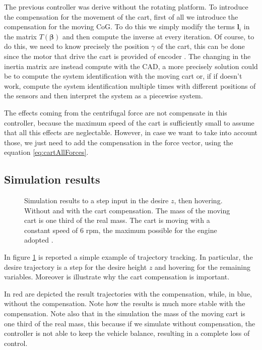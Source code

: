 \noindent The previous controller was derive without the rotating platform. To introduce the compensation for the movement of the cart, first of all we introduce the compensation for the moving CoG. To do this we simply modify the terms $\mathbf{l}_i$ in the matrix $T(\boldsymbol{\beta})$ and then compute the inverse at every iteration. Of course, to do this, we need to know precisely the position $\gamma$ of the cart, this can be done since the motor that drive the cart is provided of encoder \cite{Carlos}. The changing in the inertia matrix are instead compute with the CAD, a more precisely solution could be to compute the system identification with the moving cart or, if if doesn't work, compute the system identification multiple times with different positions of the sensors and then interpret the system as a piecewise system. 

\noindent The effects coming from the centrifugal force are not compensate in this controller, because the maximum speed of the cart is sufficiently small to assume that all this effects are neglectable. However, in case we want to take into account those, we just need to add the compensation in the force vector, using the equation \eqref{eq:cartAllForces}.

\subsection{Simulation results}

\begin{figure}[h]
	\centering
 	
 	\caption{Simulation results to a step input in the desire $z$, then hovering. Without and with the cart compensation. The mass of the moving cart is one third of the real mass. The cart is moving with a constant speed of $6$ rpm, the maximum possible for the engine adopted \cite{Carlos}.}
 	\label{fig:simulation1}		
\end{figure}

\noindent In figure \ref{fig:simulation1} is reported a simple example of trajectory tracking. In particular, the desire trajectory is a step for the desire height $z$ and hovering for the remaining variables. Moreover is illustrate why the cart compensation is important. 

\noindent In red are depicted the result trajectories with the compensation, while, in blue, without the compensation. Note how the results is much more stable with the compensation. Note also that in the simulation the mass of the moving cart is one third of the real mass, this because if we simulate without compensation, the controller is not able to keep the vehicle balance, resulting in a complete loss of control. 

